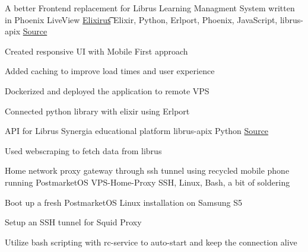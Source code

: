\begin{cventries}
  \cventry
    {A better Frontend replacement for Librus Learning Managment System written in Phoenix LiveView} %
    {\href{https://elixirus.rustysnek.xyz}{{Elixirus}\t{\faLink\acvHeaderIconSep}}} %
    {Elixir, Python, Erlport, Phoenix, JavaScript, librus-apix} %
    {\href{https://github.com/rustysnek/elixirus}{\faGithubSquare\acvHeaderIconSep Source}} %
    {
      \begin{cvitems} %
        \item {Created responsive UI with Mobile First approach}  
        \item {Added caching to improve load times and user experience}  
        \item {Dockerized and deployed the application to remote VPS}
        \item {Connected python library with elixir using Erlport}
      \end{cvitems}
    } %
  \vspace{2.00mm}
  \cventry
    {API for Librus Synergia educational platform} %
    {librus-apix} %
    {Python} %
    {\href{https://github.com/rustysnek/librus-apix}{\faGithubSquare\acvHeaderIconSep Source}} %
    {
      \begin{cvitems} %
        \item {Used webscraping to fetch data from librus}
      \end{cvitems}
    } %


  \cventry
  {Home network proxy gateway through ssh tunnel using recycled mobile phone running PostmarketOS} %
  {VPS-Home-Proxy} %
  {SSH, Linux, Bash, a bit of soldering} %
  {} %
  {
    \begin{cvitems} %
      \item {Boot up a fresh PostmarketOS Linux installation on Samsung S5}
      \item {Setup an SSH tunnel for Squid Proxy}
      \item {Utilize bash scripting with rc-service to auto-start and keep the connection alive}
    \end{cvitems}
  } %

  \vspace{-2.00mm}

\end{cventries}
